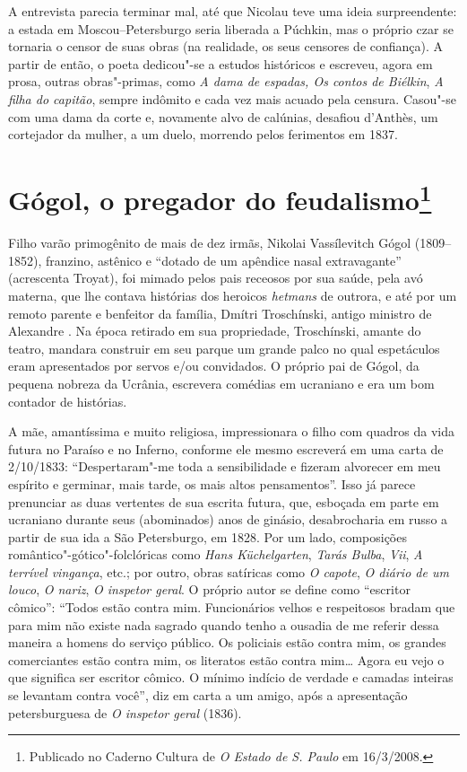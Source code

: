 A entrevista parecia terminar mal, até que Nicolau teve uma ideia
surpreendente: a estada em Moscou--Petersburgo seria liberada a Púchkin,
mas o próprio czar se tornaria o censor de suas obras (na realidade, os seus censores de confiança). A partir de então, o poeta dedicou"-se a
estudos históricos e escreveu, agora em prosa, outras obras"-primas,
como \emph{A dama de espadas, Os contos de Biélkin}, \emph{A filha do
capitão}, sempre indômito e cada vez mais acuado pela censura. Casou"-se com uma dama da corte e, novamente alvo de calúnias, desafiou d'Anthès, um cortejador da mulher, a um duelo, morrendo pelos ferimentos em 1837.



\chapter{Gógol, o pregador do feudalismo\footnote{Publicado no Caderno Cultura de \emph{O Estado de S. Paulo} em 16/3/2008.}}
\label{gogol}

Filho varão primogênito de mais de dez irmãs, Nikolai Vassílevitch
Gógol (1809--1852), franzino, astênico e ``dotado de um apêndice nasal
extravagante'' (acrescenta Troyat), foi mimado pelos pais receosos por sua saúde, pela avó materna, que lhe contava histórias dos heroicos \emph{hetmans} de outrora, e até por um remoto parente e benfeitor da família, Dmítri Troschínski, antigo ministro de Alexandre . Na época retirado em sua propriedade, Troschínski, amante do teatro, mandara construir em seu parque um grande palco no qual espetáculos eram apresentados por servos e/ou convidados. O próprio pai de Gógol, da pequena nobreza da Ucrânia, escrevera comédias em ucraniano e era um bom contador de histórias.

A mãe, amantíssima e muito religiosa, impressionara o filho com quadros da vida futura no Paraíso e no Inferno, conforme ele mesmo escreverá em uma carta de 2/10/1833: ``Despertaram"-me toda a sensibilidade e fizeram alvorecer em meu espírito e germinar, mais tarde, os mais altos pensamentos''. Isso já parece prenunciar as duas vertentes de sua escrita futura, que, esboçada em parte em ucraniano durante seus (abominados) anos de ginásio, desabrocharia em russo a partir de sua ida a São Petersburgo, em 1828. Por um lado, composições romântico"-gótico"-folclóricas como \emph{Hans Küchelgarten}, \emph{Tarás Bulba}, \emph{Vii}, \emph{A terrível vingança}, etc.; por outro, obras satíricas como \emph{O capote}, \emph{O diário de um louco}, \emph{O nariz}, \emph{O inspetor geral}. O próprio autor se define como ``escritor cômico'': ``Todos estão contra mim. Funcionários velhos e respeitosos bradam que para mim não existe nada sagrado quando tenho a ousadia de me referir dessa maneira a homens do serviço público. Os policiais estão contra mim, os grandes comerciantes estão contra mim, os literatos estão contra mim\ldots{} Agora eu vejo o que significa ser escritor cômico. O mínimo indício de verdade e camadas inteiras se levantam contra você'', diz em
carta a um amigo, após a apresentação petersburguesa de \emph{O inspetor geral} (1836).

